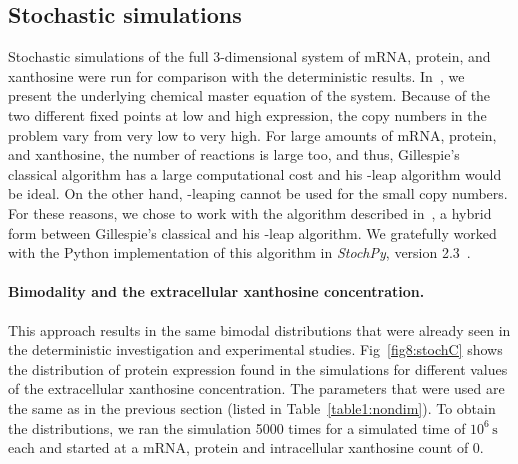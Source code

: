 \documentclass[10pt,letterpaper]{article}
\newcommand{\unit}[1]{\,\mathrm{#1}}
\begin{document}
\subsection*{Stochastic simulations}
Stochastic simulations of the full 3-dimensional system of mRNA, protein,
and xanthosine were run for comparison with the deterministic results.
In~, we present the underlying chemical master equation of
the system. Because of the two different fixed points at low and high
expression, the copy numbers in the problem vary from very low to very high.
For large amounts of mRNA, protein, and xanthosine, the number of reactions
is large too, and thus, Gillespie's classical algorithm has a large
computational cost and his \texttau-leap algorithm would be ideal. On the
other hand, \texttau-leaping cannot be used for the small copy numbers. For
these reasons, we chose to work with the algorithm described
in~\cite{Cao2006}, a hybrid form between Gillespie's classical and his
\texttau-leap algorithm. We gratefully worked with the Python implementation
of this algorithm in \emph{StochPy}, version 2.3~\cite{Maarleveld2015}.

\paragraph*{Bimodality and the extracellular xanthosine concentration.}
This approach results in the same bimodal distributions that were already
seen in the deterministic investigation and experimental studies.
Fig~\ref{fig8:stochC} shows the distribution of protein expression found in
the simulations for different values of the extracellular xanthosine
concentration. The parameters that were used are the same as in the previous
section (listed in Table~\ref{table1:nondim}). To obtain the distributions,
we ran the simulation 5000 times for a simulated time of $10^6 \unit{s}$
each and started at a mRNA, protein and intracellular xanthosine count of 0.
\end{document}
